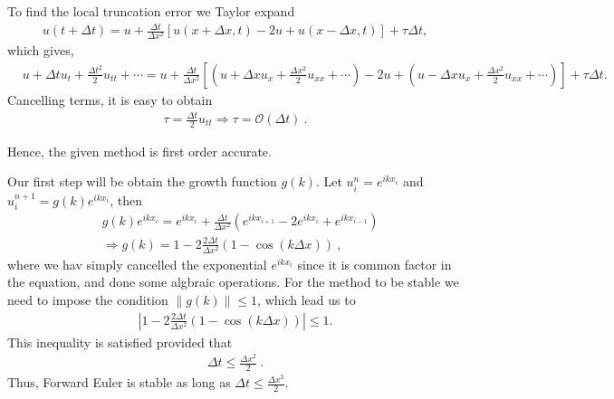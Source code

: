 \begin{questions}


\begin{solution}

To find the local truncation error we Taylor expand
\begin{align*}
u(t+\Delta t) = u + \frac{\Delta t}{\Delta x^2}\left[u(x+\Delta x,t) - 2u + u(x - \Delta x,t)\right]+\tau \Delta t,
\end{align*}
which gives,
\begin{align*}
&u + \Delta t u_t + \frac{\Delta t^2}{2}u_{tt}+\cdots = u + \frac{\Delta t}{\Delta x^2}\left[\left(u + \Delta xu_x + \frac{\Delta x^2}{2}u_{xx}+\cdots\right) -2u+\left(u - \Delta x u_x + \frac{\Delta x^2}{2}u_{xx}+\cdots\right)\right]+\tau \Delta t.
\end{align*}
Cancelling terms, it is easy to obtain
\begin{align*}
\tau = \frac{\Delta t}{2}u_{tt}\Rightarrow \tau = \mathcal{O}(\Delta t)~.
\end{align*}

Hence, the given method is first order accurate.

\end{solution}


\begin{solution}

Our first step will be obtain the growth function $g(k)$. Let $u_i^n = e^{ikx_i}$ and $u_i^{n+1} = g(k)e^{ikx_i}$, then
\begin{align*}
&g(k)e^{ikx_i} = e^{ikx_i} + \frac{\Delta t}{\Delta x^2}\left(e^{ikx_{i+1}} -2e^{ikx_i} + e^{ikx_{i-1}}\right)\\
& \Rightarrow g(k) = 1 - 2\frac{2\Delta t}{\Delta x^2}\left(1 - \cos(k \Delta x)\right)~,
\end{align*}
where we hav simply cancelled the exponential $e^{ikx_i}$ since it is common factor in the equation, and done some algbraic operations. For the method to be stable we need to impose the condition $\|g(k)\|\leq 1$, which lead us to
\begin{align*}
\left|1 - 2\frac{2\Delta t}{\Delta x^2}\left(1 - \cos(k \Delta x)\right)\right| \leq 1.
\end{align*}
This inequality is satisfied provided that
\begin{align*}
\Delta t \leq \frac{\Delta x^2}{2}~.
\end{align*}
Thus, Forward Euler is stable as long as $\Delta t \leq \frac{\Delta x^2}{2}$.

\end{solution}

\end{questions}
